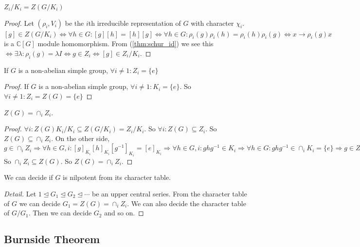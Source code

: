 \documentclass[12pt]{book}
\begin{document}
	\begin{theorem}
		$Z_i/K_i=Z(G/K_i)$
	\end{theorem}
	\begin{proof}
		Let $(\rho_i,V_i)$ be the $i$th irreducible representation of $G$ with character $\chi_i$. $[g]\in Z(G/K_i)\Leftrightarrow \forall h\in G: [g][h]=[h][g]\Leftrightarrow\forall h\in G: \rho_i(g)\rho_i(h)=\rho_i(h)\rho_i(g)\Leftrightarrow x\rightarrow\rho_i(g)x$ is a $\mathbb C[G]$ module homomorphism. From (\ref{thm:schur_id}) we see this $\Leftrightarrow \exists \lambda:\rho_i(g)=\lambda I\Leftrightarrow g\in Z_i\Leftrightarrow [g]\in Z_i/K_i$.
	\end{proof}
	
	\begin{corollary}
		If $G$ is a non-abelian simple group, $\forall i\neq 1: Z_i=\{e\}$
	\end{corollary}
	\begin{proof}
		If $G$ is a non-abelian simple group, $\forall i\neq 1: K_i=\{e\}$. So $\forall i\neq 1: Z_i=Z(G)=\{e\}$
	\end{proof}
	
	\begin{theorem}
		$Z(G)=\cap_i Z_i$.
	\end{theorem}
	\begin{proof}
		$\forall i: Z(G)K_i/K_i\subseteq Z(G/K_i)=Z_i/K_i$. So $\forall i: Z(G)\subseteq Z_i$. So $Z(G)\subseteq \cap_i Z_i$. On the other side, $g\in \cap_i Z_i\Rightarrow \forall h\in G,i: [g]_{K_i}[h]_{K_i}[g^{-1}]_{K_i}=[e]_{K_i}\Rightarrow \forall h\in G,i: ghg^{-1}\in K_i \Rightarrow \forall h\in G: ghg^{-1}\in \cap_i K_i=\{e\}\Rightarrow g\in Z(G).$ So $\cap_i Z_i\subseteq Z(G)$. So $Z(G)=\cap_i Z_i$.
	\end{proof}
	
	\begin{method}
		We can decide if $G$ is nilpotent from its character table.
	\end{method}
	\begin{proof}[Detail]
		Let $1\trianglelefteq G_1\trianglelefteq G_2\trianglelefteq \cdots$ be an upper central series. From the character table of $G$ we can decide $G_1=Z(G)=\cap_i Z_i$. We can also decide the character table of $G/G_1$. Then we can decide $G_2$ and so on.
	\end{proof}
	
	\subsection{Burnside Theorem}
	
\end{document}
